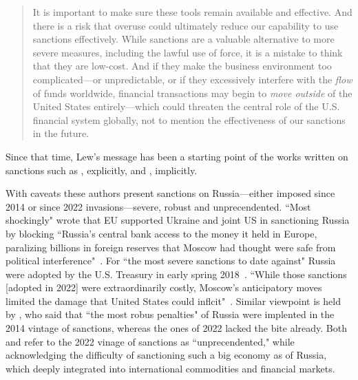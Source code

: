 \begin{quote}
It is important to make sure these tools remain available and effective. And there is a risk that overuse could ultimately reduce our capability to use sanctions effectively. While sanctions are a valuable alternative to more severe measures, including the lawful use of force, it is a mistake to think that they are low-cost. And if they make the business environment too complicated---or unpredictable, or if they excessively interfere with the \textit{flow} of funds worldwide, financial transactions may begin to \textit{move outside} of the United States entirely---which could threaten the central role of the U.S. financial system globally, not to mention the effectiveness of our sanctions in the future.~\citep[emphasis added]{lew2016}
\end{quote}

Since that time, Lew's message has been a starting point of the works written on sanctions such as \citep{mcdowell,farrell2023,mohsin2024}, explicitly, and \citep{demarais2022}, implicitly. 

With caveats these authors present sanctions on Russia---either imposed since 2014 or since 2022 invasions---severe, robust and unprecendented. ``Most shockingly" \citeauthor{farrell2023} wrote that EU supported Ukraine and joint US in sanctioning Russia by blocking ``Russia's central bank access to the money it held in Europe, paralizing billions in foreign reserves that Moscow had thought were safe from political interference"~\citep[p.~112]{farrell2023}. For \citeauthor{mcdowell} ``the most severe sanctions to date against" Russia were adopted by the U.S. Treasury in early spring 2018~\citep[p.~43]{mcdowell}. ``While those sanctions [adopted in 2022] were extraordinarily costly, Moscow's anticipatory moves limited the damage that United States could inflcit"~\citep[p.~49]{mcdowell}. Similar viewpoint is held by \citeauthor{demarais2022}, who said that ``the most robus penalties" of Russia were implented in the 2014 vintage of sanctions, whereas the ones of 2022 lacked the bite already. Both \cite{mohsin2024} and \cite{baker2024} refer to the 2022 vinage of sanctions as ``unprecendented," while acknowledging the difficulty of sanctioning such a big economy as of Russia, which deeply integrated into international commodities and financial markets.

